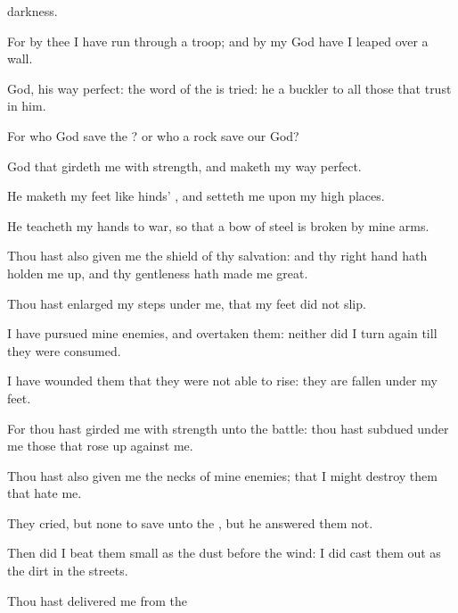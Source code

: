{darkness.
\par }{\BB \par }{\Q {}For by thee I have run
through a
troop; and by my
God have I leaped
over a
wall.
\par }{\Q {}
God, his
way
{}
perfect: the
word of the
{} is
tried: he
{} a
buckler to all those that
trust in him.
\par }{\Q {}For who
{}
God
save the
{}? or who
{} a
rock
save our
God?
\par }{\Q {}
God that
girdeth me with
strength, and
maketh my
way
perfect.
\par }{\Q {}He
maketh my
feet like
hinds’
{}, and
setteth me upon my high
places.
\par }{\Q {}He
teacheth my
hands to
war, so that a
bow of
steel is
broken by mine
arms.
\par }{\Q {}Thou hast also
given me the
shield of thy
salvation: and thy right
hand hath holden me
up, and thy
gentleness hath made me
great.
\par }{\Q {}Thou hast
enlarged my
steps under me, that my
feet did not
slip.
\par }{\Q {}I have
pursued mine
enemies, and
overtaken them: neither did I turn
again till they were
consumed.
\par }{\Q {}I have
wounded them that they were not
able to
rise: they are
fallen under my
feet.
\par }{\Q {}For thou hast
girded me with
strength unto the
battle: thou hast
subdued under me those that rose
up against me.
\par }{\Q {}Thou hast also
given me the
necks of mine
enemies; that I might
destroy them that
hate me.
\par }{\Q {}They
cried, but
{} none to
save
{} unto the
{}, but he
answered them not.
\par }{\Q {}Then did I
beat them small as the
dust
before the
wind: I did cast them
out as the
dirt in the
streets.
\par }{\Q {}Thou hast
delivered me from the
}
